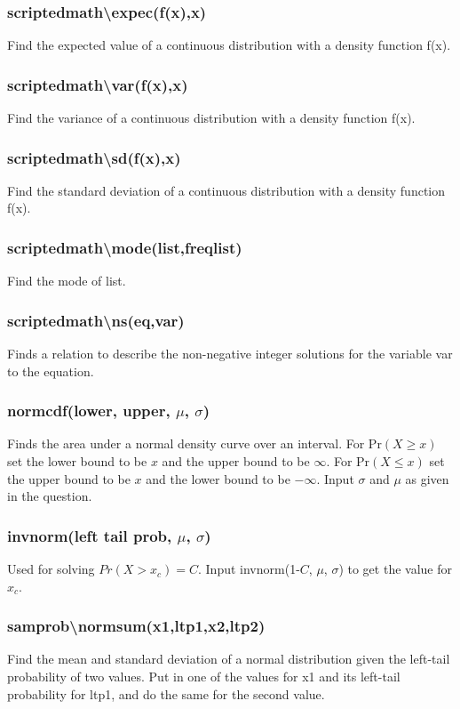 \documentclass[a4paper,twoside]{article}
\begin{document}
			\subsubsection{scriptedmath\textbackslash expec(f(x),x)} Find the expected value of a continuous distribution with a density function f(x).
			\subsubsection{scriptedmath\textbackslash var(f(x),x)} Find the variance of a continuous distribution with a density function f(x).
			\subsubsection{scriptedmath\textbackslash sd(f(x),x)} Find the standard deviation of a continuous distribution with a density function f(x).
			\subsubsection{scriptedmath\textbackslash mode(list,freqlist)} Find the mode of list.
			\subsubsection{scriptedmath\textbackslash ns(eq,var)} Finds a relation to describe the non-negative integer solutions for the variable var to the equation.
			
			\subsubsection{normcdf(lower, upper, $\mu$, $\sigma$)} Finds the area under a normal density curve over an interval. For $\mathrm{Pr}(X\geq x)$ set the lower bound to be $x$ and the upper bound to be $\infty$. For $\mathrm{Pr}(X\leq x)$ set the upper bound to be $x$ and the lower bound to be $-\infty$. Input $\sigma$ and $\mu$ as given in the question.
			
			\subsubsection{invnorm(left tail prob, $\mu$, $\sigma$)} Used for solving $Pr(X>x_c)=C$. Input invnorm(1-$C$, $\mu$, $\sigma$) to get the value for $x_c$.
			
			\subsubsection{sam\textunderscore prob\textbackslash normsum(x1,ltp1,x2,ltp2)}
			Find the mean and standard deviation of a normal distribution given the left-tail probability of two values. Put in one of the values for x1 and its left-tail probability for ltp1, and do the same for the second value.
			
\end{document}
